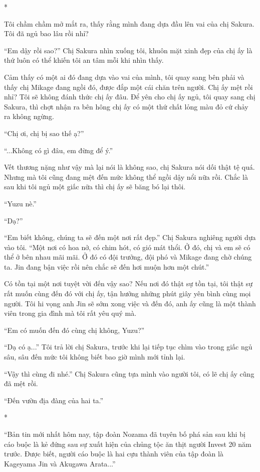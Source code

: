 {*

Tôi chầm chầm mở mắt ra, thấy rằng mình đang dựa đầu lên vai của chị
Sakura. Tôi đã ngủ bao lâu rồi nhỉ?

``Em dậy rồi sao?'' Chị Sakura nhìn xuống tôi, khuôn mặt xinh đẹp của
chị ấy là thứ luôn có thể khiến tôi an tâm mỗi khi nhìn thấy.

Cảm thấy có một ai đó đang dựa vào vai của mình, tôi quay sang bên phải
và thấy chị Mikage đang ngồi đó, được đắp một cái chăn trên người. Chị
ấy mệt rồi nhỉ? Tôi sẽ không đánh thức chị ấy đâu. Để yên cho chị ấy
ngủ, tôi quay sang chị Sakura, thì chợt nhận ra bên hông chị ấy có một
thứ chất lỏng màu đỏ cứ chảy ra không ngừng.

``Chị ơi, chị bị sao thế ạ?''

``...Không có gì đâu, em đừng để ý.''

Vết thương nặng như vậy mà lại nói là không sao, chị Sakura nói dối thật
tệ quá. Nhưng mà tôi cũng đang mệt đến mức không thể ngồi dậy nổi nữa
rồi. Chắc là sau khi tôi ngủ một giấc nữa thì chị ấy sẽ băng bó lại
thôi.

``Yuzu nè.''

``Dạ?''

``Em biết không, chúng ta sẽ đến một nơi rất đẹp.'' Chị Sakura nghiêng
người dựa vào tôi. ``Một nơi có hoa nở, có chim hót, có gió mát thổi. Ở
đó, chị và em sẽ có thể ở bên nhau mãi mãi. Ở đó có đội trưởng, đội phó
và Mikage đang chờ chúng ta. Jin đang bận việc rồi nên chắc sẽ đến hơi
muộn hơn một chút.''

Có tồn tại một nơi tuyệt vời đến vậy sao? Nếu nơi đó thật sự tồn tại,
tôi thật sự rất muốn cùng đến đó với chị ấy, tận hưởng những phút giây
yên bình cùng mọi người. Tôi hi vọng anh Jin sẽ sớm xong việc và đến đó,
anh ấy cũng là một thành viên trong gia đình mà tôi rất yêu quý mà.

``Em có muốn đến đó cùng chị không, Yuzu?''

``Dạ có ạ...'' Tôi trả lời chị Sakura, trước khi lại tiếp tục chìm vào
trong giấc ngủ sâu, sâu đến mức tôi không biết bao giờ mình mới tỉnh
lại.

``Vậy thì cùng đi nhé.'' Chị Sakura cũng tựa mình vào người tôi, có lẽ
chị ấy cũng đã mệt rồi.

``Đến vườn địa đàng của hai ta.''

*

``Bản tin mới nhất hôm nay, tập đoàn Nozama đã tuyên bố phá sản sau khi
bị cáo buộc là kẻ đứng sau sự xuất hiện của chủng tộc ăn thịt người
Invest 20 năm trước. Được biết, người cáo buộc là hai cựu thành viên của
tập đoàn là Kageyama Jin và Akugawa Arata...''

}
